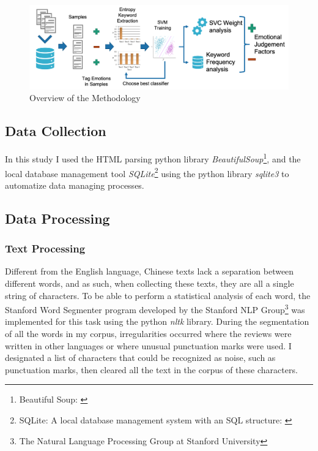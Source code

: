 \documentclass[review]{elsarticle}
\begin{document}
\begin{figure}[bp]
\centering
\includegraphics[width=\textwidth]{figures/method-overview.png}
\caption{Overview of the Methodology}
\label{fig:method-overview}
\end{figure}

\subsection{Data Collection}\label{datacollection}

In this study I used the HTML parsing python library \textit{BeautifulSoup}\footnote{\label{bs4}Beautiful Soup: \href {https://www.crummy.com/software/BeautifulSoup/}{}}, and the local database management tool \textit{SQLite}\footnote{\label{sqlite}SQLite: A local database management system with an SQL structure: \href {https://www.sqlite.org/}{}} using the python library \textit{sqlite3} to automatize data managing processes.

\subsection{Data Processing}\label{dataprocessing}

\subsubsection{Text Processing}\label{textprocessing}

Different from the English language, Chinese texts lack a separation between different words, and as such, when collecting these texts, they are all a single string of characters. To be able to perform a statistical analysis of each word, the Stanford Word Segmenter \cite{chang2008} program developed by the Stanford NLP Group\footnote{\label{stanfordnlp}The Natural Language Processing Group at Stanford University} was implemented for this task using the python \textit{nltk} library. During the segmentation of all the words in my corpus, irregularities occurred where the reviews were written in other languages or where unusual punctuation marks were used. I designated a list of characters that could be recognized as noise, such as punctuation marks, then cleared all the text in the corpus of these characters. 
\end{document}

